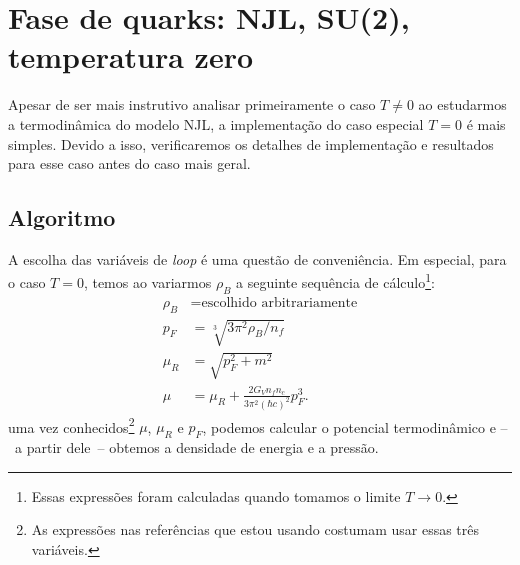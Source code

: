 \section{Fase de quarks: NJL, SU(2), temperatura zero}

Apesar de ser mais instrutivo analisar primeiramente o caso $T \neq 0$ ao estudarmos a termodinâmica do modelo NJL, a implementação do caso especial $T = 0$ é mais simples. Devido a isso, verificaremos os detalhes de implementação e resultados para esse caso antes do caso mais geral.

\subsection{Algoritmo}

A escolha das variáveis de \emph{loop} é uma questão de conveniência. Em especial, para o caso $T = 0$, temos ao variarmos $\rho_B$ a seguinte sequência de cálculo\footnote{Essas expressões foram calculadas quando tomamos o limite $T \to 0$.}:
\begin{align}
	\rho_B &= \textrm{escolhido arbitrariamente} \\
	p_F &= \sqrt[3]{3 \pi^2 \rho_B / n_f} \label{Eq:mom_fermi_rho_bar}\\
	\mu_R &= \sqrt{p_F^2 + m^2} \label{Eq:pot_quim_renorm_loop_dens_bar}\\
	\mu &= \mu_R + \frac{2 G_V n_f n_c}{3\pi^2(\hbar c)^2} p_F^3.
\end{align}
%
uma vez conhecidos\footnote{As expressões nas referências que estou usando costumam usar essas três variáveis.} $\mu$, $\mu_R$ e $p_F$, podemos calcular o potencial termodinâmico e --~a partir dele~-- obtemos a densidade de energia e a pressão.

